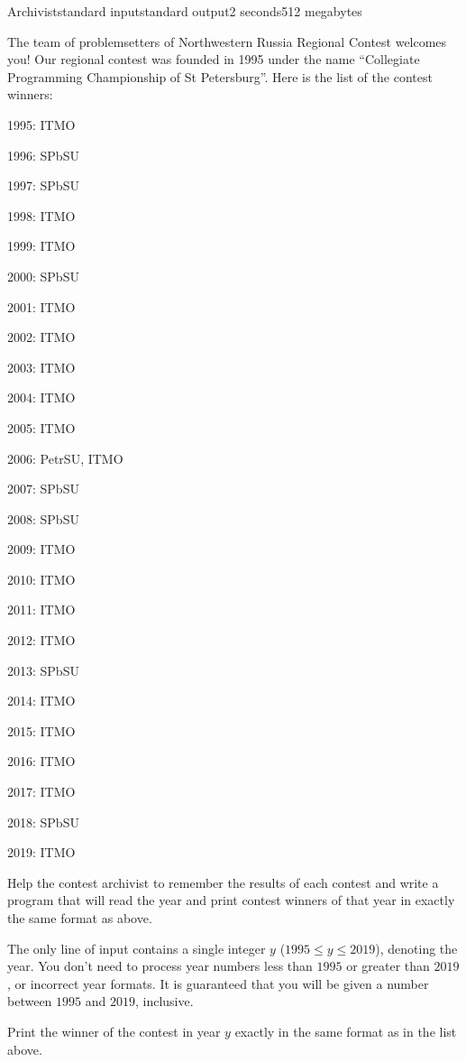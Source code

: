 \begin{problem}{Archivist}{standard input}{standard output}{2 seconds}{512 megabytes}

The team of problemsetters of Northwestern Russia Regional Contest welcomes you! Our regional contest was founded in 1995 under the name ``Collegiate Programming Championship of St Petersburg''. Here is the list of the contest winners:

\begin{shortitems}
\item 1995: ITMO
\item 1996: SPbSU
\item 1997: SPbSU
\item 1998: ITMO
\item 1999: ITMO
\item 2000: SPbSU
\item 2001: ITMO
\item 2002: ITMO
\item 2003: ITMO
\item 2004: ITMO
\item 2005: ITMO
\item 2006: PetrSU, ITMO
\item 2007: SPbSU
\item 2008: SPbSU
\item 2009: ITMO
\item 2010: ITMO
\item 2011: ITMO
\item 2012: ITMO
\item 2013: SPbSU
\item 2014: ITMO
\item 2015: ITMO
\item 2016: ITMO
\item 2017: ITMO
\item 2018: SPbSU
\item 2019: ITMO
\end{shortitems}

Help the contest archivist to remember the results of each contest and write a program that will read the year and print contest winners of that year in exactly the same format as above.

\InputFile
The only line of input contains a single integer $y$ ($1995 \le y \le 2019$), denoting the year. You don't need to process year numbers less than $1995$ or greater than $2019$, or incorrect year formats. It is guaranteed that you will be given a number between $1995$ and $2019$, inclusive.

\OutputFile
Print the winner of the contest in year $y$ exactly in the same format as in the list above.

\Examples

\begin{example}
%
%
%
%
\end{example}

\end{problem}

